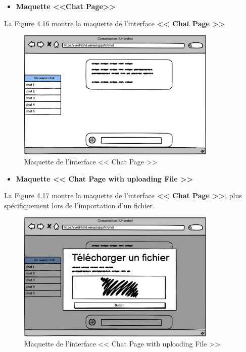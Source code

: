 \begin{itemize}
    \item \textbf{Maquette <<Chat Page>>}
\end{itemize}
La Figure 4.16 montre la maquette de l’interface \textbf{<< Chat Page >>}
\begin{figure}[H]
    \centering
    \includegraphics[width=0.85\textwidth,height=0.5\textwidth]{images/chp4/fig16.png}
    \caption{Maquette de l’interface << Chat Page >>}
    \label{fig:Maquette de l’interface <<Chat Page>>}    
\end{figure}
\begin{itemize}
    \item \textbf{Maquette << Chat Page with uploading File >>}
\end{itemize}
La Figure 4.17 montre la maquette de l’interface \textbf{<< Chat Page >>}, plus spécifiquement lors de l’importation d’un fichier.
\begin{figure}[H]
    \centering
    \includegraphics[width=0.85\textwidth,height=0.5\textwidth]{images/chp4/fig17.png}
    \caption{Maquette de l’interface << Chat Page with uploading File >>}
    \label{fig:Maquette de l’interface <<Chat Page with uploading File>>}    
\end{figure}
